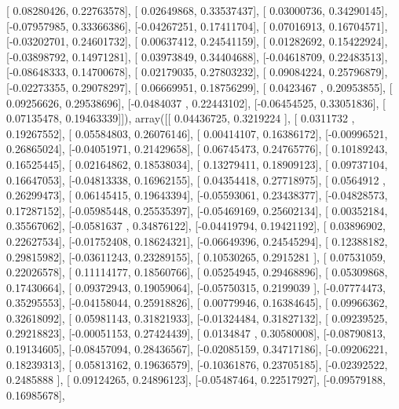 \documentclass{article}
\begin{document}
       [ 0.08280426,  0.22763578],
       [ 0.02649868,  0.33537437],
       [ 0.03000736,  0.34290145],
       [-0.07957985,  0.33366386],
       [-0.04267251,  0.17411704],
       [ 0.07016913,  0.16704571],
       [-0.03202701,  0.24601732],
       [ 0.00637412,  0.24541159],
       [ 0.01282692,  0.15422924],
       [-0.03898792,  0.14971281],
       [ 0.03973849,  0.34404688],
       [-0.04618709,  0.22483513],
       [-0.08648333,  0.14700678],
       [ 0.02179035,  0.27803232],
       [ 0.09084224,  0.25796879],
       [-0.02273355,  0.29078297],
       [ 0.06669951,  0.18756299],
       [ 0.0423467 ,  0.20953855],
       [ 0.09256626,  0.29538696],
       [-0.0484037 ,  0.22443102],
       [-0.06454525,  0.33051836],
       [ 0.07135478,  0.19463339]]), array([[ 0.04436725,  0.3219224 ],
       [ 0.0311732 ,  0.19267552],
       [ 0.05584803,  0.26076146],
       [ 0.00414107,  0.16386172],
       [-0.00996521,  0.26865024],
       [-0.04051971,  0.21429658],
       [ 0.06745473,  0.24765776],
       [ 0.10189243,  0.16525445],
       [ 0.02164862,  0.18538034],
       [ 0.13279411,  0.18909123],
       [ 0.09737104,  0.16647053],
       [-0.04813338,  0.16962155],
       [ 0.04354418,  0.27718975],
       [ 0.0564912 ,  0.26299473],
       [ 0.06145415,  0.19643394],
       [-0.05593061,  0.23438377],
       [-0.04828573,  0.17287152],
       [-0.05985448,  0.25535397],
       [-0.05469169,  0.25602134],
       [ 0.00352184,  0.35567062],
       [-0.0581637 ,  0.34876122],
       [-0.04419794,  0.19421192],
       [ 0.03896902,  0.22627534],
       [-0.01752408,  0.18624321],
       [-0.06649396,  0.24545294],
       [ 0.12388182,  0.29815982],
       [-0.03611243,  0.23289155],
       [ 0.10530265,  0.2915281 ],
       [ 0.07531059,  0.22026578],
       [ 0.11114177,  0.18560766],
       [ 0.05254945,  0.29468896],
       [ 0.05309868,  0.17430664],
       [ 0.09372943,  0.19059064],
       [-0.05750315,  0.2199039 ],
       [-0.07774473,  0.35295553],
       [-0.04158044,  0.25918826],
       [ 0.00779946,  0.16384645],
       [ 0.09966362,  0.32618092],
       [ 0.05981143,  0.31821933],
       [-0.01324484,  0.31827132],
       [ 0.09239525,  0.29218823],
       [-0.00051153,  0.27424439],
       [ 0.0134847 ,  0.30580008],
       [-0.08790813,  0.19134605],
       [-0.08457094,  0.28436567],
       [-0.02085159,  0.34717186],
       [-0.09206221,  0.18239313],
       [ 0.05813162,  0.19636579],
       [-0.10361876,  0.23705185],
       [-0.02392522,  0.2485888 ],
       [ 0.09124265,  0.24896123],
       [-0.05487464,  0.22517927],
       [-0.09579188,  0.16985678],
\end{document}
